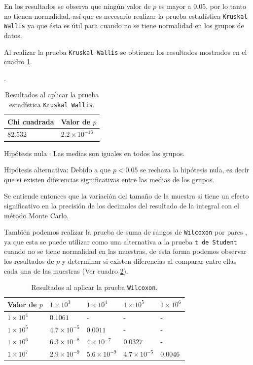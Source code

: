 \documentclass{article}
\begin{document}
En los resultados se observa que ningún valor de $p$ es mayor a $0.05$, por lo tanto no tienen normalidad, así que es necesario realizar la prueba estadística \texttt{Kruskal Wallis} ya que ésta es útil para cuando no se tiene normalidad en los grupos de datos.
\bigskip

Al realizar la prueba \texttt{Kruskal Wallis} se obtienen los resultados mostrados en el cuadro \ref{Cuadro2}.

\newpage
.
\bigskip

\begin{table}[ht]
\centering
\caption{Resultados al aplicar la prueba estadística \texttt{Kruskal Wallis}.}
\smallskip

\begin{tabular}{ |p{2.1cm}|p{2.1cm}|}
 \hline
 Chi cuadrada & Valor de $p$ \\
 \hline
 $82.532$ & $2.2\times 10^{-16}$ \\
 \hline
\end{tabular}
\label{Cuadro2}
\end{table}

Hipótesis nula : Las medias son iguales en todos los grupos.
\smallskip

Hipótesis alternativa: Debido a que $p < 0.05$ se rechaza la hipótesis nula, es decir que si existen diferencias significativas entre las medias de los grupos. 
\smallskip

Se entiende entonces que la variación del tamaño de la muestra si tiene un efecto significativo en la precisión de los decimales del resultado de la integral con el método Monte Carlo.
\bigskip

También podemos realizar la prueba de suma de rangos de \texttt{Wilcoxon} por pares \citep{4}, ya que esta se puede utilizar como una alternativa a la prueba \texttt{t de Student} cuando no se tiene normalidad en las muestras, de esta forma podemos observar los resultados de $p$ y determinar si existen diferencias al comparar entre ellas cada una de las muestras (Ver cuadro \ref{Cuadro3}).

\begin{table}[ht]
\centering
\caption{Resultados al aplicar la prueba \texttt{Wilcoxon}.}
\smallskip

\begin{tabular}{ |p{2.1cm}|p{2.1cm}|p{2.1cm}|p{2.1cm}|p{2.1cm}|}
 \hline
Valor de $p$ & $1\times 10^{3}$ & $1\times 10^{4}$ & $1\times 10^{5}$ & $1\times 10^{6}$\\
 \hline
 $1\times 10^{4}$ & $0.1061$ & - & - & - \\
 \hline
  $1\times 10^{5}$ & $4.7\times 10^{-5}$ & $0.0011$ & - & -\\
 \hline
  $1\times 10^{6}$ & $6.3\times 10^{-8}$ & $4\times 10^{-7}$ & $0.0327$ & - \\
 \hline
  $1\times 10^{7}$ & $2.9\times 10^{-9}$ & $5.6\times 10^{-9}$ & $4.7\times 10^{-5}$ & $0.0046$ \\
 \hline
\end{tabular}
\label{Cuadro3}
\end{table}
\end{document}
